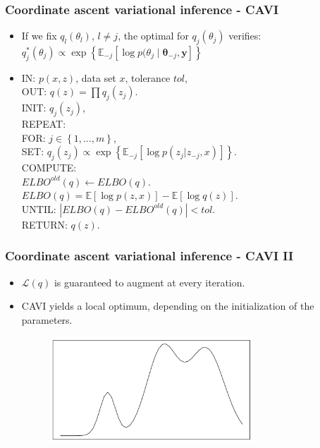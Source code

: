 \documentclass{beamer}
\begin{document}
\begin{frame}
\frametitle{Coordinate ascent variational inference - CAVI}
\begin{itemize}
\item If we fix $q_l(\theta_l)$, $l \neq j$, the optimal for $q_j(\theta_j)$ verifies: $q^*_j(\theta_j) \propto \exp\left\lbrace\mathbb{E}_{-j}\left[\log p(\theta_j \mid \boldsymbol{\theta}_{-j},\boldsymbol{y}\right]\right\rbrace$
\item \begin{text}
IN: $p(x,z)$, data set $x$, tolerance $tol$,\\
OUT: $q(z) = \prod q_j(z_j)$.\\
INIT: $q_j(z_j)$, \\
REPEAT:\\
\quad FOR: $j \in \left\lbrace1, \dots, m\right\rbrace$,\\
\quad \quad SET: $q_j(z_j) \propto \exp\left\lbrace\mathbb{E}_{-j}\left[\log p(z_j|z_{-j},x)\right]\right\rbrace$.\\
\quad COMPUTE:\\
\quad \quad $ELBO^{old}(q) \leftarrow ELBO(q)$.\\
\quad \quad $ELBO(q) = \mathbb{E}\left[\log p(z,x)\right] - \mathbb{E}\left[\log q(z) \right] $.\\
UNTIL: $|ELBO(q)-ELBO^{old}(q)|<tol$.\\
RETURN: $q(z).$
\end{text}
\end{itemize}
\end{frame}

\begin{frame}
\frametitle{Coordinate ascent variational inference - CAVI II}
\begin{itemize}
\item $\mathcal{L}(q)$ is guaranteed to augment at every iteration.
\item CAVI yields a local optimum, depending on the initialization of the parameters.
\begin{figure}
\includegraphics[width=3in]{images/localOptimum.png}
\end{figure}
\end{itemize}
\end{frame}
\end{document}
